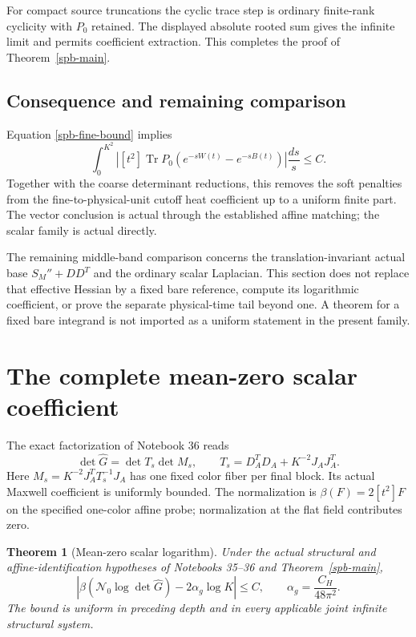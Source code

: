 \documentclass[11pt]{article}
\newtheorem{theorem}{Theorem}[section]
\theoremstyle{remark}
\begin{document}
For compact source truncations the cyclic trace step is ordinary
finite-rank cyclicity with $P_0$ retained. The displayed absolute
rooted sum gives the infinite limit and permits coefficient extraction.
This completes the proof of Theorem~\ref{spb-main}.

\subsection{Consequence and remaining comparison}
\label{spb-scope}

Equation \eqref{spb-fine-bound} implies
\begin{equation}
 \int_0^{K^2}\left|[t^2]\operatorname{Tr}
 P_0(e^{-sW(t)}-e^{-sB(t)})\right|\frac{ds}{s}\le C.
 \label{spb-integrated}
\end{equation}
Together with the coarse determinant reductions, this removes the
soft penalties from the fine-to-physical-unit cutoff heat coefficient
up to a uniform finite part. The vector conclusion is actual through
the established affine matching; the scalar family is actual directly.

The remaining middle-band comparison concerns the translation-invariant
actual base $S_M''+DD^T$ and the ordinary scalar Laplacian.
This section does not replace that effective Hessian by a fixed bare
reference, compute its logarithmic coefficient, or prove the separate
physical-time tail beyond one. A theorem for a fixed bare integrand
is not imported as a uniform statement in the present family.



\section{The complete mean-zero scalar coefficient}
\label{sgc-section}

The exact factorization of Notebook 36 reads
\[
 \det\widehat G=\det T_s\det M_s,\qquad
 T_s=D_A^TD_A+K^{-2}J_AJ_A^T.
\]
Here \(M_s=K^{-2}J_A^TT_s^{-1}J_A\) has one fixed color
fiber per final block. Its actual Maxwell coefficient is uniformly
bounded. The normalization is
\(\beta(F)=2[t^2]F\) on the specified one-color affine probe;
normalization at the flat field contributes zero.

\begin{theorem}[Mean-zero scalar logarithm]
\label{sgc-main}
Under the actual structural and affine-identification hypotheses of
Notebooks 35--36 and Theorem~\ref{spb-main},
\begin{equation}
 \left|\beta(\mathcal N_0\log\det\widehat G)
                 -2\alpha_g\log K\right|\le C,
 \qquad \alpha_g=\frac{C_H}{48\pi^2}.
 \label{sgc-coefficient}
\end{equation}
The bound is uniform in preceding depth and in every applicable
joint infinite structural system.
\end{theorem}
\end{document}

